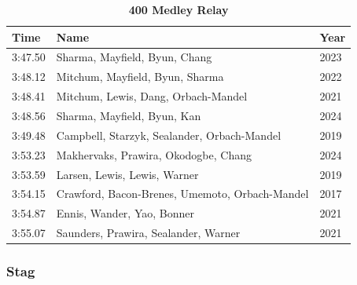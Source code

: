 \begin{table}[H]
    \begin{table}[H]
        \centering
        \caption*{\textbf{\textcolor{teamprimary}{400 Medley Relay}}}
        \renewcommand{\arraystretch}{2}
        \begin{tabular}{@{}p{}p{}p{}@{}}
        \toprule
        \rowcolor{teamprimary!25}
        \textbf{Time} & \textbf{Name} & \textbf{Year} \\
        \midrule
    3:47.50 & Sharma, Mayfield, Byun, Chang & 2023 \\
    3:48.12 & Mitchum, Mayfield, Byun, Sharma & 2022 \\
    3:48.41 & Mitchum, Lewis, Dang, Orbach-Mandel & 2021 \\
    3:48.56 & Sharma, Mayfield, Byun, Kan & 2024 \\
    3:49.48 & Campbell, Starzyk, Sealander, Orbach-Mandel & 2019 \\
    3:53.23 & Makhervaks, Prawira, Okodogbe, Chang & 2024 \\
    3:53.59 & Larsen, Lewis, Lewis, Warner & 2019 \\
    3:54.15 & Crawford, Bacon-Brenes, Umemoto, Orbach-Mandel & 2017 \\
    3:54.87 & Ennis, Wander, Yao, Bonner & 2021 \\
    3:55.07 & Saunders, Prawira, Sealander, Warner & 2021 \\
    \bottomrule
\end{tabular}
    \end{table}
\end{table}

\subsubsection{Stag}

